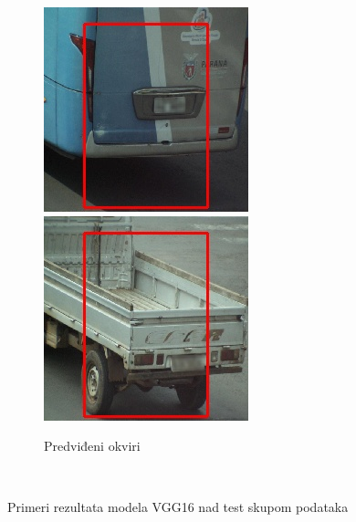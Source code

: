 \documentclass[12pt,oneside]{memoir}
\begin{document}
\begin{figure}
\begin{subfigure}[b]{0.35\textwidth}
        \includegraphics[width=\textwidth]{matfmaster/vgg16_base/bus_pred.jpg}
        \includegraphics[width=\textwidth]{matfmaster/vgg16_base/truck_pred.jpg}
        \caption{Predviđeni okviri}
    \end{subfigure}
    ~
    \caption{Primeri rezultata modela VGG16 nad test skupom podataka}
    \label{fig:section4_vgg16prediction}
\end{figure}
\end{document}
